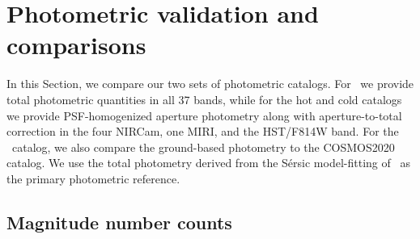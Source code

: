 \documentclass[longauth]{aa}
\begin{document}
\section{Photometric validation and comparisons} \label{sec:photometry-validation}

In this Section, we compare our two sets of photometric catalogs. For \SEpp\ we provide total photometric quantities in all 37 bands, while for the hot and cold catalogs we provide PSF-homogenized aperture photometry along with aperture-to-total correction in the four NIRCam, one MIRI, and the HST/F814W band. For the \SEpp\ catalog, we also compare the ground-based photometry to the COSMOS2020 catalog. We use the total photometry derived from the S\'ersic model-fitting of \SEpp\ as the primary photometric reference. 


\subsection{Magnitude number counts} \label{sec:mag-number-counts}
\end{document}
